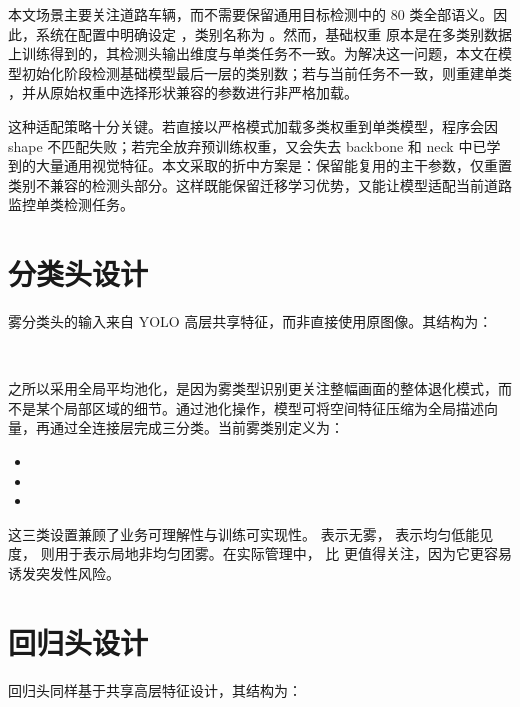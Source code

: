 本文场景主要关注道路车辆，而不需要保留通用目标检测中的 80 类全部语义。因此，系统在配置中明确设定 ，类别名称为 \code{["vehicle"]}。然而，基础权重  原本是在多类别数据上训练得到的，其检测头输出维度与单类任务不一致。为解决这一问题，本文在模型初始化阶段检测基础模型最后一层的类别数；若与当前任务不一致，则重建单类 ，并从原始权重中选择形状兼容的参数进行非严格加载。

这种适配策略十分关键。若直接以严格模式加载多类权重到单类模型，程序会因 shape 不匹配失败；若完全放弃预训练权重，又会失去 backbone 和 neck 中已学到的大量通用视觉特征。本文采取的折中方案是：保留能复用的主干参数，仅重置类别不兼容的检测头部分。这样既能保留迁移学习优势，又能让模型适配当前道路监控单类检测任务\cite{ultralyticsDocs}。

\section{分类头设计}

雾分类头的输入来自 YOLO 高层共享特征，而非直接使用原图像。其结构为：

\begin{center}
\small
{}\\
\end{center}

之所以采用全局平均池化，是因为雾类型识别更关注整幅画面的整体退化模式，而不是某个局部区域的细节。通过池化操作，模型可将空间特征压缩为全局描述向量，再通过全连接层完成三分类。当前雾类别定义为：

\begin{itemize}[leftmargin=2em]
\item {}
\item {}
\item {}
\end{itemize}

这三类设置兼顾了业务可理解性与训练可实现性。 表示无雾， 表示均匀低能见度， 则用于表示局地非均匀团雾。在实际管理中， 比  更值得关注，因为它更容易诱发突发性风险。

\section{回归头设计}

回归头同样基于共享高层特征设计，其结构为：

